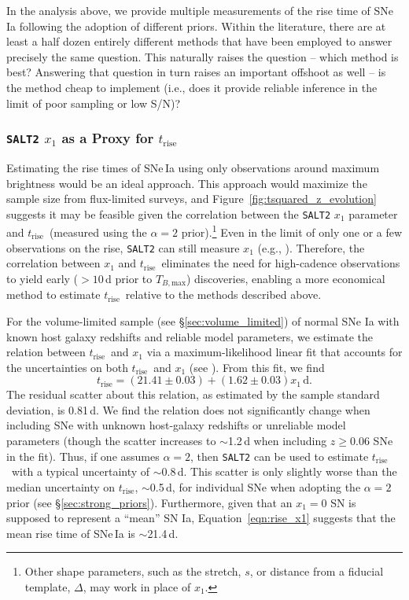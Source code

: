 \documentclass[twocolumn]{./aastex63}
\newcommand{\trise}{$t_\mathrm{rise}$}
\newcommand{\tbmax}{$T_{B,\mathrm{max}}$}
\begin{document}
In the analysis above, we provide multiple measurements of the rise time of
SNe Ia following the adoption of different priors. Within the literature,
there are at least a half dozen entirely different methods that have been
employed to answer precisely the same question. This naturally raises the
question -- which method is best? Answering that question in turn raises an
important offshoot as well -- is the method cheap to implement (i.e., does it
provide reliable inference in the limit of poor sampling or low S/N)?

\subsubsection{\texttt{SALT2} $x_1$ as a Proxy for \trise}\label{sec:x1_rise}

Estimating the rise times of SNe\,Ia using only observations around maximum
brightness would be an ideal approach. This approach would maximize the sample
size from flux-limited surveys, and Figure~\ref{fig:tsquared_z_evolution}
suggests it may be feasible given the correlation between the \texttt{SALT2}
$x_1$ parameter and \trise\ (measured using the $\alpha = 2$
prior).\footnote{Other shape parameters, such as the stretch, $s$, or distance
from a fiducial template, $\Delta$, may work in place of $x_1$.} Even in the
limit of only one or a few observations on the rise, \texttt{SALT2} can still
measure $x_1$ (e.g., \citealt{Scolnic18a}). Therefore, the correlation between
$x_1$ and \trise\ eliminates the need for high-cadence observations to yield
early ($> 10$\,d prior to \tbmax) discoveries, enabling a more economical
method to estimate \trise\ relative to the methods described above.

For the volume-limited sample (see \S\ref{sec:volume_limited}) of normal SNe
Ia with known host galaxy redshifts and reliable model parameters, we estimate
the relation between \trise\ and $x_1$ via a maximum-likelihood linear fit
that accounts for the uncertainties on both \trise\ and $x_1$ (see
\citealt{Hogg10}). From this fit, we find
%
\begin{equation}
    t_\mathrm{rise} = (21.41 \pm 0.03) + (1.62 \pm 0.03)x_1\,\mathrm{d}.
    \label{eqn:rise_x1}
\end{equation} 
%
The residual scatter about this relation, as estimated by the sample standard
deviation, is 0.81\,d. We find the relation does not significantly change when
including SNe with unknown host-galaxy redshifts or unreliable model
parameters (though the scatter increases to $\sim$1.2\,d when including $z \ge
0.06$ SNe in the fit). Thus, if one assumes $\alpha = 2$, then \texttt{SALT2}
can be used to estimate \trise\ with a typical uncertainty of $\sim$0.8\,d.
This scatter is only slightly worse than the median uncertainty on \trise,
$\sim$0.5\,d, for individual SNe when adopting the $\alpha = 2$ prior (see
\S\ref{sec:strong_priors}). Furthermore, given that an $x_1 = 0$ SN is
supposed to represent a ``mean'' SN Ia, Equation~\ref{eqn:rise_x1} suggests
that the mean rise time of SNe\,Ia is $\sim$21.4\,d.
\end{document}
